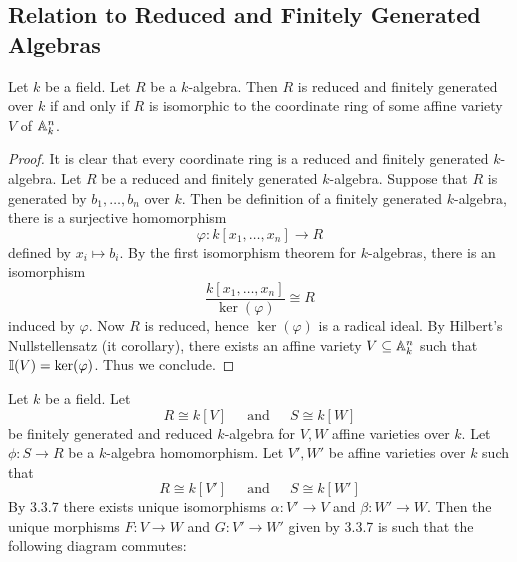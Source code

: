 \documentclass[a4paper]{article}
\begin{document}
\subsection{Relation to Reduced and Finitely Generated Algebras}
\begin{prp}{}{} Let $k$ be a field. Let $R$ be a $k$-algebra. Then $R$ is reduced and finitely generated over $k$ if and only if $R$ is isomorphic to the coordinate ring of some affine variety $V$ of $\mathbb{A}_k^n$. \tcbline
\begin{proof}
It is clear that every coordinate ring is a reduced and finitely generated $k$-algebra. Let $R$ be a reduced and finitely generated $k$-algebra. Suppose that $R$ is generated by $b_1,\dots,b_n$ over $k$. Then be definition of a finitely generated $k$-algebra, there is a surjective homomorphism $$\varphi:k[x_1,\dots,x_n]\to R$$ defined by $x_i\mapsto b_i$. By the first isomorphism theorem for $k$-algebras, there is an isomorphism $$\frac{k[x_1,\dots,x_n]}{\ker(\varphi)}\cong R$$ induced by $\varphi$. Now $R$ is reduced, hence $\ker(\varphi)$ is a radical ideal. By Hilbert's Nullstellensatz (it corollary), there exists an affine variety $V\subseteq\mathbb{A}_k^n$ such that $\mathbb{I}(V)=\ker(\varphi)$. Thus we conclude. 
\end{proof}
\end{prp}

\begin{prp}{}{} Let $k$ be a field. Let $$R\cong k[V]\;\;\;\;\text{ and }\;\;\;\; S\cong k[W]$$ be finitely generated and reduced $k$-algebra for $V,W$ affine varieties over $k$. Let $\phi:S\to R$ be a $k$-algebra homomorphism. Let $V',W'$ be affine varieties over $k$ such that $$R\cong k[V']\;\;\;\;\text{ and }\;\;\;\; S\cong k[W']$$ By 3.3.7 there exists unique isomorphisms $\alpha:V'\to V$ and $\beta:W'\to W$. Then the unique morphisms $F:V\to W$ and $G:V'\to W'$ given by 3.3.7 is such that the following diagram commutes: \\~\\
 \\~\\
\end{prp}
\end{document}
